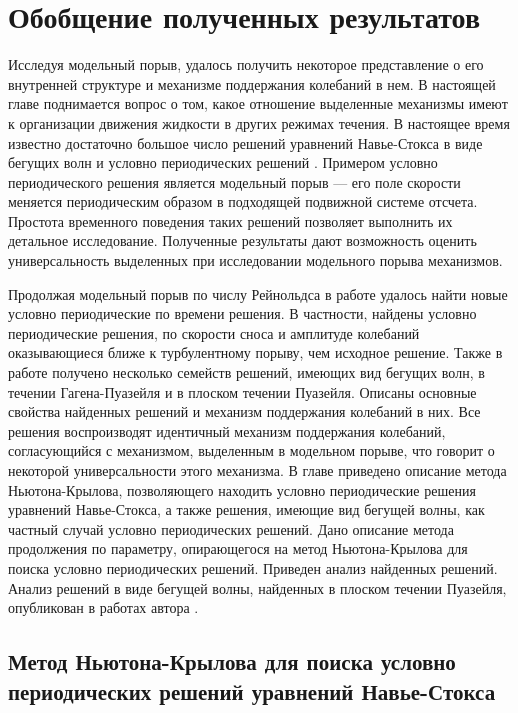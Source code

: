 
\chapter{Обобщение полученных результатов}

Исследуя модельный порыв, удалось получить некоторое представление о его внутренней структуре и механизме поддержания колебаний в нем. В настоящей главе поднимается вопрос о том, какое отношение выделенные механизмы имеют к организации движения жидкости в других режимах течения. В настоящее время известно достаточно большое число решений уравнений Навье-Стокса в виде бегущих волн и условно периодических решений  \cite{Kawahara2012}. Примером условно периодического решения является модельный порыв --- его поле скорости меняется периодическим образом в подходящей подвижной системе отсчета. Простота временного поведения таких решений позволяет выполнить их детальное исследование. Полученные результаты дают возможность оценить универсальность выделенных при исследовании модельного порыва механизмов. 

Продолжая модельный порыв по числу Рейнольдса в работе удалось найти новые условно периодические по времени решения. В частности, найдены условно периодические решения, по скорости сноса и амплитуде колебаний оказывающиеся ближе к турбулентному порыву, чем исходное решение. Также в работе получено несколько семейств решений, имеющих вид бегущих волн, в течении Гагена-Пуазейля и в плоском течении Пуазейля. Описаны основные свойства найденных решений и механизм поддержания колебаний в них. Все решения воспроизводят идентичный механизм поддержания колебаний, согласующийся с механизмом, выделенным в модельном порыве, что говорит о некоторой универсальности этого механизма. В главе приведено описание метода Ньютона-Крылова, позволяющего находить условно периодические решения уравнений Навье-Стокса, а также решения, имеющие вид бегущей волны, как частный случай условно периодических решений. Дано описание метода продолжения по параметру, опирающегося на метод Ньютона-Крылова для поиска условно периодических решений. Приведен анализ найденных решений. Анализ решений в виде бегущей волны, найденных в плоском течении Пуазейля, опубликован в работах автора \cite{Vest18, KMU16}. 

\section{Метод Ньютона-Крылова для поиска условно периодических решений уравнений Навье-Стокса}


